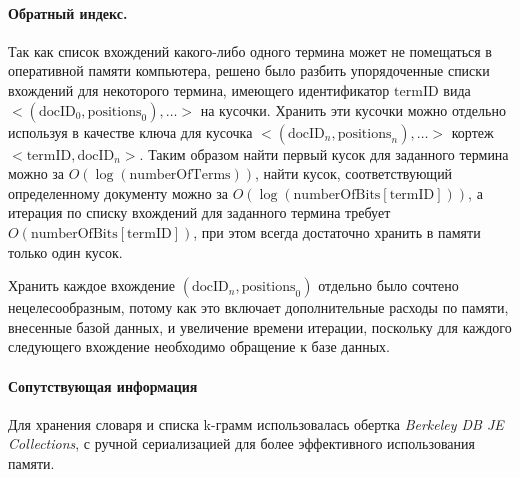 \documentclass[12pt]{article}
\begin{document}
\paragraph{Обратный индекс.} Так как список вхождений какого-либо одного термина может не помещаться в оперативной 
памяти компьютера, решено было разбить упорядоченные списки вхождений для некоторого
термина, имеющего идентификатор $\mathrm{termID}$ вида 
$<(\mathrm{docID}_0, \mathrm{positions}_0), \ldots>$ на кусочки. 
Хранить эти кусочки можно отдельно используя в качестве ключа для 
кусочка $<(\mathrm{docID}_n, \mathrm{positions}_n), \ldots>$
кортеж $<\mathrm{termID}, \mathrm{docID}_n>$. Таким образом найти 
первый кусок для заданного термина можно за $O(\log(\mathrm{numberOfTerms}))$, 
найти кусок, соответствующий определенному документу
можно за $O(\log(\mathrm{numberOfBits}[\mathrm{termID}]))$, а итерация по списку 
вхождений для заданного термина требует $O(\mathrm{numberOfBits}[\mathrm{termID}])$, 
при этом всегда достаточно хранить в памяти только один кусок.

Хранить каждое вхождение $(\mathrm{docID}_n, \mathrm{positions}_0)$ отдельно 
было сочтено нецелесообразным, потому как это включает дополнительные расходы по памяти, внесенные
базой данных, и увеличение времени итерации, поскольку для каждого следующего вхождение 
необходимо обращение к базе данных.

\paragraph{Сопутствующая информация} Для хранения словаря и списка k-грамм
использовалась обертка \emph{Berkeley DB JE Collections}, с ручной сериализацией для
более эффективного использования памяти.
\end{document}
